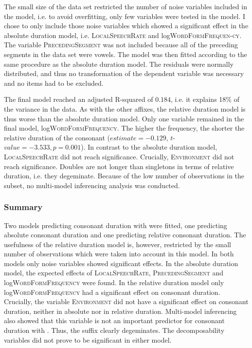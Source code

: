 The small size of the data set restricted the number of noise variables included in the model, i.e. to avoid overfitting, only few variables were tested in the model. I chose to only include those noise variables which showed a significant effect in the absolute duration model, i.e. \textsc{LocalSpeechRate} and log\textsc{WordFormFrequen-cy}. The variable \textsc{PrecedingSegment} was not included because all of the preceding segments in the data set were vowels. The model was then fitted according to the same procedure as the absolute duration model. The residuals were normally distributed, and thus no transformation of the dependent variable was necessary and no items had to be excluded.

The final model reached an adjusted R-squared of $0.184$, i.e. it explains 18\% of the variance in the data. As with the other affixes, the relative duration model is thus worse than the absolute duration model. Only one variable remained in the final model, log\textsc{WordFormFrequency}. The higher the frequency, the shorter the relative duration of the consonant ($estimate= -0.129$, $t$-$value=-3.533, p=0.001$). In contrast to the absolute duration model, \textsc{LocalSpeechRate} did not reach significance. Crucially, \textsc{Environment} did not reach significance. Doubles are not longer than singletons in terms of relative duration, i.e. they degeminate.
Because of the low number of observations in the subset, no multi-model inferencing analysis was conducted.

\subsubsection{Summary}
Two models predicting consonant duration with  were fitted, one predicting absolute consonant duration and one predicting relative consonant duration. The usefulness of the relative duration model is, however,  restricted by the small number of observations which were taken into account in this model. In both models only noise variables showed significant effects. 
In the absolute duration model, the expected effects of \textsc{LocalSpeechRate}, \textsc{PrecedingSegment} and log\textsc{WordFormFrequency} were found. In the relative duration model only log\textsc{WordFormFrequency} had a significant effect on consonant duration.
Crucially, the variable \textsc{Environment} did not have a significant effect on consonant duration, neither in absolute nor in relative duration. Multi-model inferencing also showed that this variable is not an important predictor for consonant duration with . Thus, the suffix  clearly degeminates.
The decomposability variables did not prove to be significant in either model.




